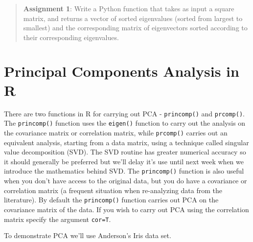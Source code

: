 \begin{quote}
\textbf{Assignment 1}: Write a Python function that takes as input a
square matrix, and returns a vector of sorted eigenvalues (sorted from
largest to smallest) and the corresponding matrix of eigenvectors sorted
according to their corresponding eigenvalues.

\end{quote}
\section{Principal Components Analysis in R}

There are two functions in R for carrying out PCA -
\lstinline!princomp()! and \lstinline!prcomp()!. The
\lstinline!princomp()! function uses the \lstinline!eigen()! function to
carry out the analysis on the covariance matrix or correlation matrix,
while \lstinline!prcomp()! carries out an equivalent analysis, starting
from a data matrix, using a technique called singular value
decomposition (SVD). The SVD routine has greater numerical accuracy so
it should generally be preferred but we'll delay it's use until next
week when we introduce the mathematics behind SVD. The
\lstinline!princomp()! function is also useful when you don't have
access to the original data, but you do have a covariance or correlation
matrix (a frequent situation when re-analyzing data from the
literature). By default the \lstinline!princomp()! function carries out
PCA on the covariance matrix of the data. If you wish to carry out PCA
using the correlation matrix specify the argument \lstinline!cor=T!.

To demonstrate PCA we'll use Anderson's Iris data set.

